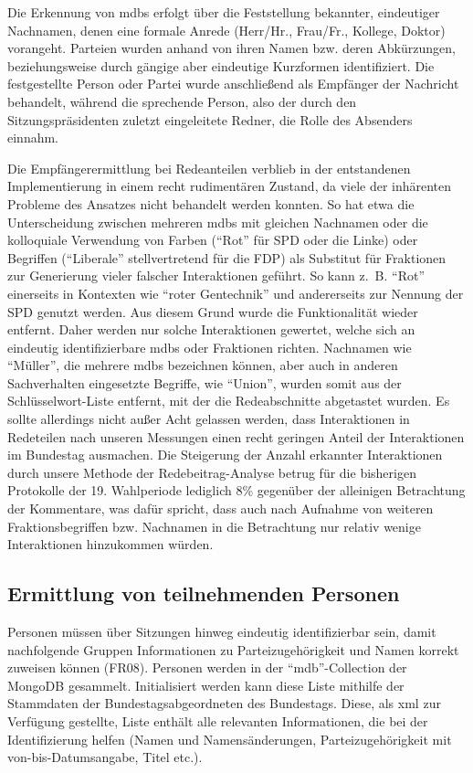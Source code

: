 Die Erkennung von \glspl{mdb} erfolgt über die Feststellung bekannter, eindeutiger
Nachnamen, denen eine formale Anrede (Herr/Hr., Frau/Fr., Kollege, Doktor)
vorangeht. Parteien wurden anhand von ihren Namen bzw. deren Abkürzungen,
beziehungsweise durch gängige aber eindeutige Kurzformen identifiziert. Die
festgestellte Person oder Partei wurde anschließend als Empfänger der Nachricht
behandelt, während die sprechende Person, also der durch den
Sitzungspräsidenten zuletzt eingeleitete Redner, die Rolle des Absenders
einnahm.

Die Empfängerermittlung bei Redeanteilen verblieb in der entstandenen
Implementierung in einem recht rudimentären Zustand, da viele der inhärenten
Probleme des Ansatzes nicht behandelt werden konnten. So hat etwa die
Unterscheidung zwischen mehreren \glspl{mdb} mit gleichen Nachnamen oder die
kolloquiale Verwendung von Farben (\enquote{Rot} für SPD oder die Linke) oder
Begriffen (\enquote{Liberale} stellvertretend für die FDP) als Substitut für
Fraktionen zur Generierung vieler falscher Interaktionen geführt. So kann
z.~B. \enquote{Rot} einerseits in Kontexten wie \enquote{roter Gentechnik} und
andererseits zur Nennung der SPD genutzt werden. Aus diesem Grund wurde die
Funktionalität wieder entfernt. Daher werden nur solche Interaktionen gewertet,
welche sich an eindeutig identifizierbare \glspl{mdb} oder Fraktionen richten.
Nachnamen wie \enquote{Müller}, die mehrere \glspl{mdb} bezeichnen können, aber
auch in anderen Sachverhalten eingesetzte Begriffe, wie \enquote{Union}, wurden
somit aus der Schlüsselwort-Liste entfernt, mit der die Redeabschnitte
abgetastet wurden. Es sollte allerdings nicht außer Acht gelassen werden, dass
Interaktionen in Redeteilen nach unseren Messungen einen recht geringen Anteil
der Interaktionen im Bundestag ausmachen. Die Steigerung der Anzahl erkannter
Interaktionen durch unsere Methode der Redebeitrag-Analyse betrug für die
bisherigen Protokolle der 19. Wahlperiode lediglich 8\% gegenüber der
alleinigen Betrachtung der Kommentare, was dafür spricht, dass auch nach
Aufnahme von weiteren Fraktionsbegriffen bzw. Nachnamen in die Betrachtung nur
relativ wenige Interaktionen hinzukommen würden.

\subsection{Ermittlung von teilnehmenden Personen}
Personen müssen über Sitzungen hinweg eindeutig identifizierbar sein, damit
nachfolgende Gruppen Informationen zu Parteizugehörigkeit und Namen korrekt
zuweisen können (FR08). Personen werden in der \enquote{mdb}-Collection der MongoDB
gesammelt. Initialisiert werden kann diese Liste mithilfe der Stammdaten der
Bundestagsabgeordneten des Bundestags. Diese, als \gls{xml} zur Verfügung gestellte,
Liste enthält alle relevanten Informationen, die bei der Identifizierung
helfen (Namen und Namensänderungen, Parteizugehörigkeit mit von-bis-Datumsangabe,
Titel etc.).

